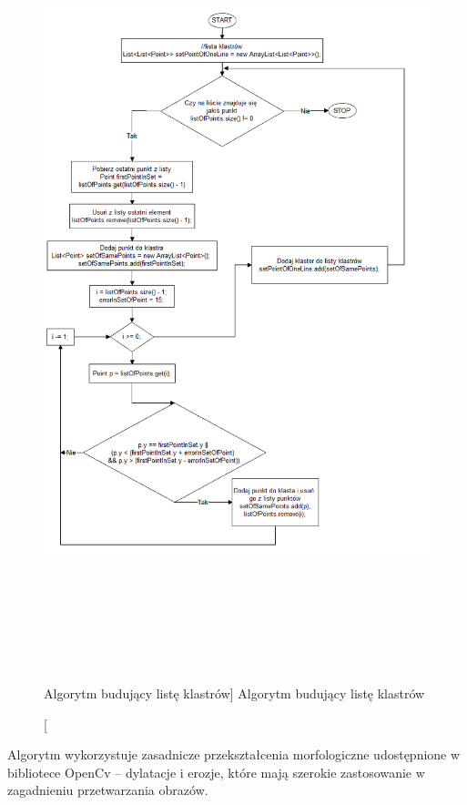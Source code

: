 \documentclass[a4paper,12pt]{article}
\begin{document}
    			\begin{figure}[!ht]  
    		        \begin{center}
    		    	    \includegraphics[height=22.5cm]{image//algorithm//prepareImgToAnalizePred.png} 
    			    \end{center}
        			\caption
        			    [Algorytm budujący listę klastrów]  
            			{Algorytm budujący listę klastrów}  \label{fig:makeClaster}
    		    \end{figure}
		        \newpage
		        Algorytm wykorzystuje zasadnicze przekształcenia morfologiczne udostępnione w bibliotece OpenCv -- dylatacje i erozje, które mają szerokie zastosowanie w zagadnieniu przetwarzania obrazów. 
		        
\end{document}

